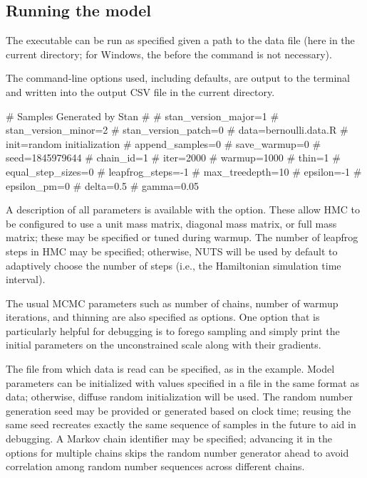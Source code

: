 \documentclass[article]{jss}
\begin{document}
\subsection{Running the model}

The executable can be run as specified given a path to the data file
(here  in the current directory; for
Windows, the  before the command is not necessary).
%
\begin{CodeChunk}
\end{CodeChunk}
%
The command-line options used, including defaults, are output to the
terminal and written into the output CSV file in the current directory.
%
\begin{Code}
# Samples Generated by Stan
#
# stan_version_major=1
# stan_version_minor=2
# stan_version_patch=0
# data=bernoulli.data.R
# init=random initialization
# append_samples=0
# save_warmup=0
# seed=1845979644
# chain_id=1
# iter=2000
# warmup=1000
# thin=1
# equal_step_sizes=0
# leapfrog_steps=-1
# max_treedepth=10
# epsilon=-1
# epsilon_pm=0
# delta=0.5
# gamma=0.05
\end{Code}
%
A description of all parameters is available with the 
option.  These allow HMC to be configured to use a unit mass matrix,
diagonal mass matrix, or full mass matrix; these may be specified or
tuned during warmup. The number of leapfrog steps in HMC may be
specified; otherwise, NUTS will be used by default to adaptively
choose the number of steps (i.e., the Hamiltonian simulation time
interval).

The usual MCMC parameters such as number of chains, number of warmup
iterations, and thinning are also specified as options.  One option
that is particularly helpful for debugging is to forego sampling and
simply print the initial parameters on the unconstrained scale along
with their gradients.  

The file from which data is read can be specified, as in the example.
Model parameters can be initialized with values specified in a file in
the same format as data; otherwise, diffuse random initialization will
be used.  The random number generation seed may be provided or
generated based on clock time; reusing the same seed recreates exactly
the same sequence of samples in the future to aid in debugging.  A
Markov chain identifier may be specified; advancing it in the options
for multiple chains skips the random number generator ahead to avoid
correlation among random number sequences across different chains.
\end{document}
